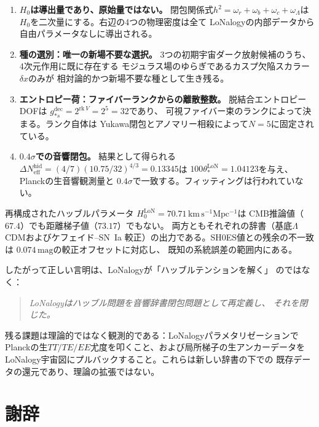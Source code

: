 \documentclass[12pt]{article}
\theoremstyle{plain}
\theoremstyle{definition}
\numberwithin{equation}{section}
\newcommand{\eff}{\mathrm{eff}}
\newcommand{\LoN}{\mathrm{LoN}}
\newcommand{\hid}{\mathrm{hid}}
\newcommand{\dec}{\mathrm{dec}}
\begin{document}
\begin{enumerate}
\item \textbf{$H_0$は導出量であり、原始量ではない。}
閉包関係式$h^2=\omega_r+\omega_b+\omega_c+\omega_\Lambda$は
$H_0$を二次量にする。右辺の4つの物理密度は全て
LoNalogyの内部データから自由パラメータなしに導出される。

\item \textbf{種の選別：唯一の新場不要な選択。}
3つの初期宇宙ダーク放射候補のうち、4次元作用に既に存在する
モジュラス場のゆらぎであるカスプ欠陥スカラー$\delta x$のみが
相対論的かつ新場不要な種として生き残る。

\item \textbf{エントロピー荷：ファイバーランクからの離散整数。}
脱結合エントロピーDOFは
$g_{*s}^{\dec}=2^{\mathrm{rk}\,V}=2^5=32$であり、
可視ファイバー束のランクによって決まる。ランク自体は
Yukawa閉包とアノマリー相殺によって$N=5$に固定されている。

\item \textbf{$0.4\sigma$での音響閉包。}
結果として得られる
$\Delta N_{\eff}^{\hid}=(4/7)(10.75/32)^{4/3}=0.13345$は
$100\theta_*^{\LoN}=1.04123$を与え、Planckの生音響観測量と
$0.4\sigma$で一致する。フィッティングは行われていない。
\end{enumerate}

再構成されたハッブルパラメータ
$H_0^{\LoN}=70.71\,\mathrm{km\,s^{-1}Mpc^{-1}}$は
CMB推論値（$67.4$）でも距離梯子値（$73.17$）でもない。
両方ともそれぞれの辞書（基底$\Lambda$CDMおよびケフェイド--SN~Ia
較正）の出力である。SH0ES値との残余の不一致は
$0.074\,\mathrm{mag}$の較正オフセットに対応し、
既知の系統誤差の範囲内にある。

したがって正しい言明は、LoNalogyが「ハッブルテンションを解く」
のではなく：

\begin{quote}
\emph{LoNalogyはハッブル問題を音響辞書閉包問題として再定義し、
それを閉じた。}
\end{quote}

残る課題は理論的ではなく観測的である：LoNalogyパラメタリゼーションで
Planckの生$TT/TE/EE$尤度を叩くこと、および局所梯子の生アンカーデータを
LoNalogy宇宙図にプルバックすること。これらは新しい辞書の下での
既存データの還元であり、理論の拡張ではない。


\section*{謝辞}
\end{document}
